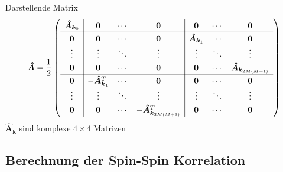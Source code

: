 \documentclass[11pt]{beamer}
\begin{document}
    \begin{frame}{Darstellende Matrix}
    \begin{equation} \nonumber
    \renewcommand{\arraystretch}{1.3}
    \bm{\hat{A}} = \frac{1}{2}
        \left(\begin{array}{c|ccc|ccc} 
        \bm{\hat{A}}_{\bm{k}_0}  & \bm{0}   & \cdots    & \bm{0} & \bm{0} & \cdots  & \bm{0} \\ \hline
        \bm{0}  & \bm{0}       & \cdots   & \bm{0}    & \bm{\hat{A}}_{\bm{k}_1} & \cdots  & \bm{0} \\
        \vdots  &\vdots        & \ddots   & \vdots    & \vdots                  & \ddots  & \vdots \\
        \bm{0}  & \bm{0}       & \cdots   & \bm{0} & \bm{0} & \cdots  & \bm{\hat{A}}_{\bm{k}_{2M(M+1)}}  \\ \hline
        \bm{0}  & -\bm{\hat{A}}^T_{\bm{k}_1} & \cdots  & \bm{0} & \bm{0} & \cdots  & \bm{0} \\
        \vdots  &\vdots        & \ddots   & \vdots    & \vdots                  & \ddots  & \vdots \\
        \bm{0}  & \bm{0}       & \cdots   &-\bm{\hat{A}}_{\bm{k}_{2M(M+1)}}^T & \bm{0} & \cdots  & \bm{0} 
        \end{array} \right) 
    \end{equation}
    \vspace{0.5cm}
    \centering
    $\hat{\bm{A}}_{\bm{k}}$ sind komplexe $4\times 4$ Matrizen

    \end{frame}
        
\subsection{Berechnung der Spin-Spin Korrelation}
\end{document}
